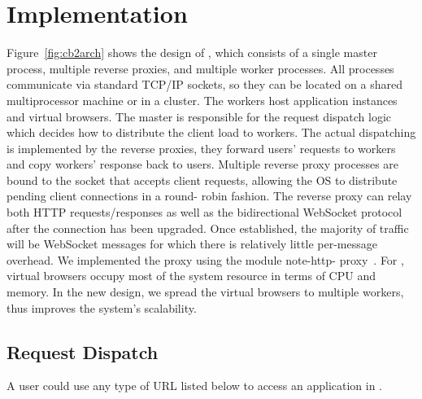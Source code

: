 \chapter{Implementation} 
\label{ch:impl} 

\newarchitectureoverview{}

Figure~\ref{fig:cb2arch} shows the design of \cbtwo, which consists of a
single master process, multiple reverse proxies, and multiple worker
processes. All processes communicate via standard TCP/IP sockets, so they can
be located on a shared multiprocessor machine or in a cluster. The workers
host application instances and virtual browsers. The master is responsible for
the request dispatch logic which decides how to distribute the client load to
workers. The actual dispatching is implemented by the reverse proxies, they
forward users' requests to workers and copy workers' response back to users.
Multiple reverse proxy processes are bound to the socket that accepts client
requests, allowing the OS to distribute pending client connections in a round-
robin fashion. The reverse proxy can relay both HTTP requests/responses as
well as the bidirectional WebSocket protocol after the connection has been
upgraded.  Once established, the majority of traffic will be WebSocket
messages for which there is relatively little per-message overhead.  We
implemented the proxy using the \nodejs{} module note-http-
proxy~\cite{nodeproxy}. For \cb, virtual browsers occupy most of the system
resource in terms of CPU and memory. In the new design, we spread the virtual
browsers to multiple workers, thus improves the system's scalability.



\section{Request Dispatch} 
\label{sec:bootstrap} 

A user could use any type of URL listed below to access an application in
\cb{}.

